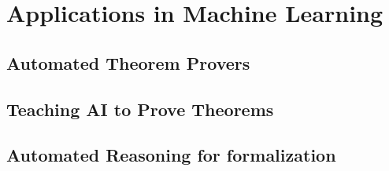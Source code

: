 \chapter{Applications in Machine Learning }

\section{Automated Theorem Provers}
\section{Teaching AI to Prove Theorems}
\section{Automated Reasoning for formalization}